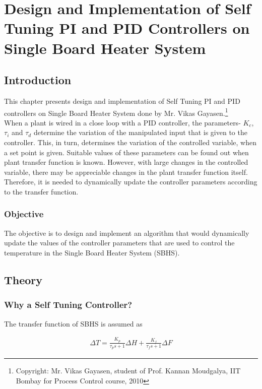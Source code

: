 
\chapter{Design and Implementation of Self Tuning PI and PID Controllers on Single Board Heater System}

\section{Introduction}%
This chapter presents design and implementation of Self Tuning PI and PID controllers on Single Board Heater System done by
Mr. Vikas Gayasen.\footnote{Copyright: Mr. Vikas Gayasen, student of Prof. Kannan Moudgalya, IIT Bombay for Process Control 
course, 2010}\\
When a plant is wired in a close loop with a PID controller, the parameters- $K_c$, $\tau_i$ and $\tau_d$ determine the 
variation of the manipulated input that is given to the controller. This, in turn, determines the variation of the controlled
variable, when a set point is given. Suitable values of these parameters can be found out when plant transfer function is 
known. However, with large changes in the controlled variable, there may be appreciable changes in the plant transfer 
function itself. Therefore, it is needed to dynamically update the controller parameters according to the transfer function.

\subsection{Objective}%
The objective is to design and implement an algorithm that would dynamically update the values 
of the controller parameters that are used to control the temperature in the Single Board Heater System (SBHS).



\section{Theory}
\subsection{Why a Self Tuning Controller?}
The transfer function of SBHS is assumed as 


\begin{align}
\Delta T = \frac {K_p}{\tau_ps+1} \Delta H + \frac {K_f}{\tau_fs+1} \Delta F 
\end{align}
 
